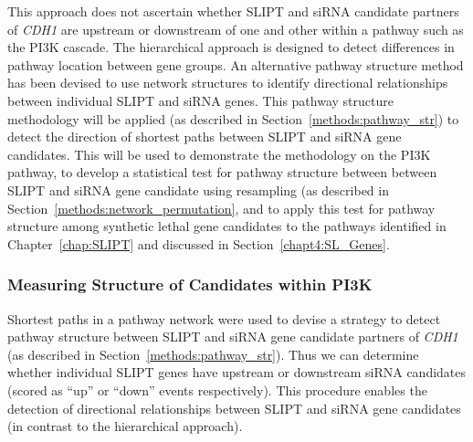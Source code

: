 This approach does not ascertain whether \gls{SLIPT} and \gls{siRNA} candidate partners of \textit{CDH1} are upstream or downstream of one and other within a pathway such as the \gls{PI3K} cascade. The hierarchical approach is designed to detect differences in pathway location between gene groups. An alternative pathway structure method has been devised to use network structures to identify directional relationships between individual \gls{SLIPT} and \gls{siRNA} genes. This pathway structure methodology will be applied (as described in Section~\ref{methods:pathway_str}) to detect the direction of shortest paths between \gls{SLIPT} and \gls{siRNA} gene candidates. This will be used to demonstrate the methodology on the \gls{PI3K} pathway, to develop a statistical test for pathway structure between between \gls{SLIPT} and \gls{siRNA} gene candidate using resampling  (as described in Section~\ref{methods:network_permutation}, and to apply this test for pathway structure among synthetic lethal gene candidates to the pathways identified in Chapter~\ref{chap:SLIPT} and discussed in Section~\ref{chapt4:SL_Genes}.

\FloatBarrier

\subsubsection{Measuring Structure of Candidates within PI3K}  \label{chapt4:Structure_PI3K}

Shortest paths in a pathway network were used to devise a strategy to detect pathway structure between \gls{SLIPT} and \gls{siRNA} gene candidate partners of \textit{CDH1} (as described in Section~\ref{methods:pathway_str}). Thus we can determine whether individual \gls{SLIPT} genes have upstream or downstream \gls{siRNA} candidates (scored as ``up'' or ``down'' events respectively). This procedure enables the detection of directional relationships between \gls{SLIPT} and \gls{siRNA} gene candidates (in contrast to the hierarchical approach).




